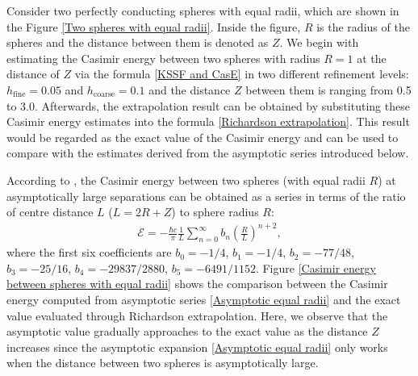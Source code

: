 Consider two perfectly conducting spheres with equal radii, which are shown in the Figure \ref{Two spheres with equal radii}. Inside the figure, $R$ is the radius 
of the spheres and the distance between them is denoted as $Z$. We begin with estimating the Casimir energy between two spheres with radius $R = 1$ at the 
distance of $Z$ via the formula \eqref{KSSF and CasE} in two different refinement levels: $h_{\text{fine}} = 0.05$ and $h_{\text{coarse}} = 0.1$ and the 
distance $Z$ between them is ranging from 0.5 to 3.0. Afterwards, the extrapolation result can be obtained by substituting these Casimir energy estimates into 
the formula \eqref{Richardson extrapolation}. This result would be regarded as the exact value of the Casimir energy and can be used to compare with the 
estimates derived from the asymptotic series introduced below. 

According to \cite{emig2008casimir}, the Casimir energy between two spheres (with equal radii $R$) at asymptotically 
large separations can be obtained as a series in terms of the ratio of centre distance $L$ ($L = 2R + Z$) to sphere radius $R$:
\begin{align}\label{Asymptotic equal radii}
   \mathcal{E} = -\frac{\hbar c}{\pi}\frac{1}{L}\sum_{n=0}^{\infty}b_{n}\left(\frac{R}{L}\right)^{n+2},
\end{align}
where the first six coefficients are 
$b_{0} = -1/4$, $b_{1} = -1/4$,  $b_{2} = -77/48$,  $b_{3} = -25/16$,  $b_{4} = -29837/2880$, $b_{5} = -6491/1152$. Figure 
\ref{Casimir energy between spheres with equal radii} shows the comparison between the Casimir energy computed from asymptotic series 
\eqref{Asymptotic equal radii} and the exact value evaluated through {Richardson extrapolation}. Here, we observe that the asymptotic value gradually 
approaches to the exact value as the distance $Z$ increases since the asymptotic expansion \eqref{Asymptotic equal radii} only works when the distance 
between two spheres is asymptotically large.

